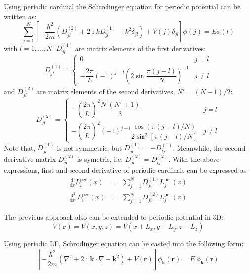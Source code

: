 Using periodic cardinal the Schrodinger equation for periodic potential
can be written as:
\begin{equation}
\sum_{j=1}^{N}\left[-\frac{\hbar^{2}}{2m}\left(D_{jl}^{(2)}+2\imath kD_{jl}^{(1)}-k^{2}\delta_{jl}\right)+V(j)\delta_{jl}\right]\phi(j)=E\phi(l)
\end{equation}
with $l=1,\ldots,N$. $D_{jl}^{(1)}$ are matrix elements of the first
derivatives:
\begin{equation}
D_{jl}^{(1)}=\begin{cases}
0 & j=l\\
-\dfrac{2\pi}{L}(-1)^{j-l}\left(2\sin\dfrac{\pi(j-l)}{N}\right)^{-1} & j\neq l
\end{cases}
\end{equation}
and $D_{jl}^{(2)}$ are matrix elements of the second derivatives,
$N'=(N-1)/2$:
\begin{equation}
D_{jl}^{(2)}=\begin{cases}
-\left(\dfrac{2\pi}{L}\right)^{2}\dfrac{N'(N'+1)}{3} & j=l\\
-\left(\dfrac{2\pi}{L}\right)^{2}(-1)^{j-l}\dfrac{\cos\left(\pi(j-l)/N\right)}{2\sin^{2}\left[\pi(j-l)/N\right]} & j\neq l
\end{cases}
\end{equation}
Note that, $D_{jl}^{(1)}$ is not symmetric, but $D_{jl}^{(1)}=-D_{lj}^{(1)}$.
Meanwhile, the second derivative matrix $D_{jl}^{(2)}$ is symetric,
i.e. $D_{jl}^{(2)}=D_{lj}^{(2)}$. With the above expressions, first
and second derivative of periodic cardinals can be expressed as
\begin{eqnarray}
\frac{\mathrm{d}}{\mathrm{d}x}L_{i}^{\mathrm{per}}(x) & = & \sum_{j=1}^{N}D_{ji}^{(1)}L_{j}^{\mathrm{per}}(x)\\
\frac{\mathrm{d}^{2}}{\mathrm{d}x^{2}}L_{i}^{\mathrm{per}}(x) & = & \sum_{j=1}^{N}D_{ji}^{(2)}L_{j}^{\mathrm{per}}(x)
\end{eqnarray}


The previous approach also can be extended to periodic potential in 3D:
\[
V(\mathbf{r})=V(x,y,z)=V\left(x+L_{x},y+L_{y},z+L_{z}\right)
\]

Using periodic LF, Schrodinger equation can be casted into the following form:
\begin{equation}
\left[-\dfrac{\hbar^{2}}{2m}\left(\nabla^{2}+2\imath\mathbf{k}\cdot\nabla-\mathbf{k}^{2}\right)+V(\mathbf{r})\right]\phi_{\mathbf{k}}(\mathbf{r})=E\ \phi_{\mathbf{k}}(\mathbf{r})
\end{equation}


